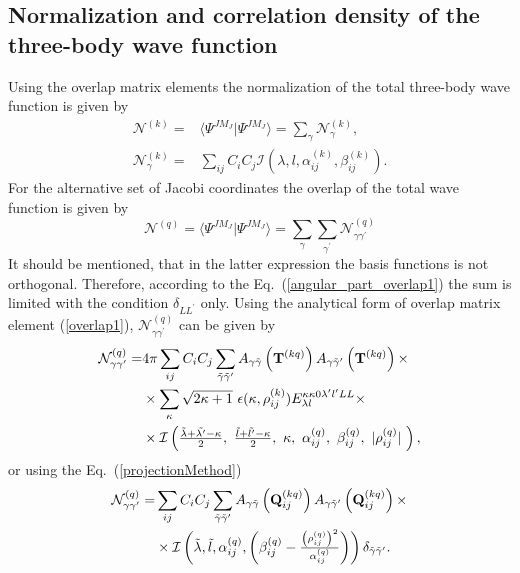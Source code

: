 \documentclass[
12pt, %
oneside, %
english, %
onehalfspacing, %
headsepline, %
]{MastersDoctoralThesis} %
\begin{document}
\subsection{Normalization and correlation density of the three-body wave function}
Using the overlap matrix elements the normalization of the total three-body wave function is given by
\begin{align}
\mathcal{N}^{(k)}= & \langle \Psi^{JM_J} \vert \Psi^{JM_J} \rangle = \sum_{\gamma} \mathcal{N}^{(k)}_{\gamma},    \nonumber \\
 \mathcal{N}^{(k)}_{\gamma} = & \sum_{ij} C_i C_j \mathcal{I} \left( \lambda,l,\alpha_{ij}^{(k)},\beta_{ij}^{(k)} \right).
\end{align}
For the alternative set of Jacobi coordinates the overlap of the total wave function is given by
\begin{equation}
\mathcal{N}^{(q)}= \langle \Psi^{JM_J} \vert \Psi^{JM_J} \rangle = \sum_{\gamma} \sum_{\gamma^{\prime}} \mathcal{N}^{(q)}_{\gamma \gamma^{\prime}}
\end{equation}
It should be mentioned, that in the latter expression the basis functions is not orthogonal. Therefore, according to the Eq.~(\ref{angular_part_overlap1}) the sum is limited with the condition $\delta_{LL^{\prime}}$ only. Using the analytical form  of overlap matrix element (\ref{overlap1}), $\mathcal{N}^{(q)}_{\gamma \gamma^{\prime}}$ can be given by
\begin{align}
\mathcal{N}^{(q)}_{\gamma \gamma^{\prime}}= & 4 \pi \sum_{ij} C_i C_j \sum_{\tilde{\gamma}\tilde{\gamma}^{\prime}}  A_{\gamma\tilde{\gamma}}\left( {\bf T}^{(kq)} \right) A_{\gamma\tilde{\gamma}^{\prime}}\left( {\bf T}^{(kq)} \right) \times
\nonumber \\
 & \times \sum_{\kappa} \sqrt{2\kappa+1}~ \epsilon(\kappa, \rho^{(k)}_{ij}) {E}^{\kappa \kappa 0 \lambda^{\prime} l^{\prime} L L}_{\lambda l} \times  \nonumber 
 \\ & \times \mathcal{I}\left(
 \tfrac{\tilde{\lambda}+\tilde{\lambda^{\prime}}-\kappa}{2}, ~
 \tfrac{\tilde{l}+\tilde{l^{\prime}}-\kappa}{2},~
 \kappa,~
 \alpha^{(q)}_{ij},~
 \beta^{(q)}_{ij} ,~
 \vert \rho^{(q)}_{ij} \vert ~
  \right),
\end{align}
or using the Eq.~(\ref{projectionMethod})
\begin{align}
\mathcal{N}^{(q)}_{\gamma \gamma^{\prime}}= & \sum_{ij} C_i C_j  \sum_{\tilde{\gamma}\tilde{\gamma}^{\prime}}
A_{\gamma\tilde{\gamma}}\left( {\bf Q}_{ij}^{(kq)} \right)
 A_{\gamma\tilde{\gamma}^{\prime}}\left( {\bf Q}_{ij}^{(kq)} \right) \times\nonumber \\
 & \times
  \mathcal{I} \left( \tilde{\lambda}, \tilde{l}, \alpha^{(q)}_{ij}, \left(  \beta^{(q)}_{ij} - \tfrac{\left(\rho^{(q)}_{ij}\right)^2}{\alpha^{(q)}_{ij}} \right) \right) \delta_{\tilde{\gamma}\tilde{\gamma}^{\prime}}.
\end{align}  
\end{document}
